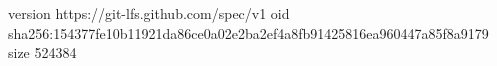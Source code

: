 version https://git-lfs.github.com/spec/v1
oid sha256:154377fe10b11921da86ce0a02e2ba2ef4a8fb91425816ea960447a85f8a9179
size 524384
